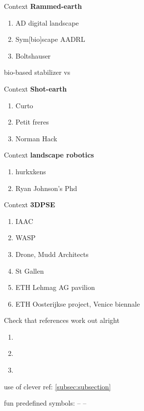         Context \textbf{Rammed-earth}
        \begin{enumerate}
            \item AD digital landscape
            \item Sym[bio]scape AADRL
            \item Boltshauser
        \end{enumerate}

        bio-based stabilizer vs

        Context \textbf{Shot-earth}
        \begin{enumerate}
            \item Curto
            \item Petit freres
            \item Norman Hack
        \end{enumerate}

        Context \textbf{landscape robotics}
        \begin{enumerate}
            \item hurkxkens~\cite{hurkxkens_robotic_2020, hurkxkens_shifting_2021}
            \item Ryan Johnson's Phd~\cite{johns_autonomous_2020}
        \end{enumerate}

        Context \textbf{3DPSE}

        \begin{enumerate}
            \item IAAC
            \item WASP
            \item Drone, Mudd Architects
            \item St Gallen
            \item ETH Lehmag AG pavilion
            \item ETH Oosterijkse project, Venice biennale
        \end{enumerate}


        Check that references work out alright \cite{khan_sustainability_2021}

        \begin{enumerate}
            \item ~\cite{lim_3d_2020}
            \item ~\cite{curto_shot-earth_2020}
            \item ~\cite{crane_geodesics_2013}
        \end{enumerate}

        use of clever ref: \cref{subsec:subsection}

        fun predefined symbols: \kjoeb -- \cotwee -- \carboneq


